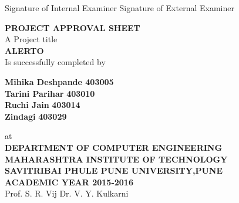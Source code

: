 \documentclass[12pt,a4paper]{report}
\begin{document}
\begin{center}
\begin{center}
	Signature of Internal Examiner \hspace{0.7 in} \hspace{0.7 in} Signature of External Examiner
\end{center}

\begin{center}
	\textbf{PROJECT APPROVAL SHEET}\\
	\vspace{0.2 in}
	A Project title\\
	\vspace{0.1 in}
	\textbf{ALERTO}\\
	\vspace{0.15 in}
	Is successfully completed by\\
	\begin{flushleft}
		\begin{flushleft}
			\hspace{1.7in}\textbf{Mihika Deshpande     403005}\\
			\hspace{1.7in}\textbf{Tarini Parihar}    
			\hspace{0.3in}\textbf{  403010}\\
			\hspace{1.7in}\textbf{Ruchi Jain}\hspace{0.65in}\textbf{           403014}\\
			\hspace{1.7in}\textbf{Zindagi}\hspace{0.94in}\textbf{              403029}\\
		\end{flushleft}
	\end{flushleft}
	at\\
	\vspace{0.1 in}
\textbf{DEPARTMENT OF COMPUTER ENGINEERING}\\
	\vspace{0.1 in}
	\textbf{MAHARASHTRA INSTITUTE OF TECHNOLOGY}\\
	\vspace{0.1 in}
	\textbf{SAVITRIBAI PHULE PUNE UNIVERSITY,PUNE}\\
	\vspace*{0.1 in}
	\textbf{ACADEMIC YEAR 2015-2016}\\
	\vspace{0.9 in}
	Prof. S. R. Vij \hspace{0.9 in}\hspace{0.9 in} \hspace{0.9 in}Dr. V. Y. Kulkarni\\

\end{center}
\end{center}
\end{document}
